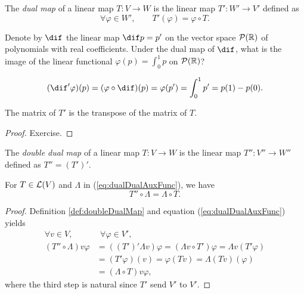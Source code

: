 \begin{defn}
  \label{def:dualMap}
  The \emph{dual map} of a linear map $T: V\rightarrow W$
   is the linear map $T': W'\rightarrow V'$
   defined as
   \begin{equation}
     \label{eq:dualMap}
     \forall\varphi\in W',\qquad
     T'(\varphi) = \varphi\circ T.
   \end{equation}
\end{defn}

\begin{exc}
  Denote by $\dif$ the linear map $\dif p = p'$ on 
   the vector space ${\cal P}(\mathbb{R})$
   of polynomials with real coefficients.
  Under the dual map of $\dif$,
  what is the image of
   the linear functional $\varphi(p)=\int_0^1 p$
   on ${\cal P}(\mathbb{R})$?   
\end{exc}
\begin{solution}
  \begin{displaymath}
     (\dif' \varphi)(p) = (\varphi\circ \dif)(p)
     = \varphi(p') = \int_0^1 p' = p(1) - p(0).
  \end{displaymath}
\end{solution}

\begin{thm}
  \label{thm:matrixOfDualMap}
  The matrix of $T'$ is the transpose of the matrix of $T$.
\end{thm}
\begin{proof}
  Exercise.
\end{proof}

\begin{defn}
  \label{def:doubleDualMap}
  The \emph{double dual map} of a linear map $T: V\rightarrow W$
   is the linear map $T'': V''\rightarrow W''$
   defined as $T'' = (T')'$.
\end{defn}

\begin{thm}
  \label{thm:doubleDualMapCommute}
  For $T\in {\cal L}(V)$ and $\Lambda$ in (\ref{eq:dualDualAuxFunc}),
   we have
   \begin{equation}
     \label{eq:doubleDualMapCommute}
     T''\circ \Lambda = \Lambda\circ T.
   \end{equation}
\end{thm}
\begin{proof}
  Definition \ref{def:doubleDualMap} and
   equation (\ref{eq:dualDualAuxFunc}) yields
   \begin{align*}
     \forall v\in V,&\ \ \forall \varphi\in V',
     \\
     (T''\circ \Lambda) v \varphi
     &= ((T')' \Lambda v) \varphi
     = (\Lambda v \circ T')\varphi
     = \Lambda v ( T'\varphi)
     \\
     &= (T' \varphi) (v)
     = \varphi(Tv)
     = \Lambda(Tv)(\varphi)
       \\
     &= (\Lambda\circ T) v \varphi,
   \end{align*}
   where the third step is natural
   since $T'$ send $V'$ to $V'$.
\end{proof}

